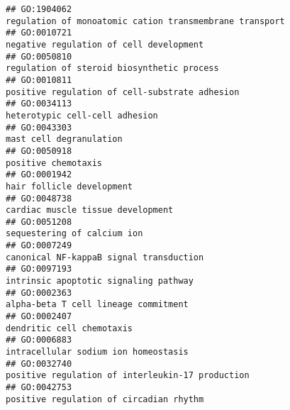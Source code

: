 \documentclass[
]{article}
\begin{document}
\begin{verbatim}
## GO:1904062                                                                                          regulation of monoatomic cation transmembrane transport
## GO:0010721                                                                                                          negative regulation of cell development
## GO:0050810                                                                                                       regulation of steroid biosynthetic process
## GO:0010811                                                                                                   positive regulation of cell-substrate adhesion
## GO:0034113                                                                                                                   heterotypic cell-cell adhesion
## GO:0043303                                                                                                                          mast cell degranulation
## GO:0050918                                                                                                                              positive chemotaxis
## GO:0001942                                                                                                                        hair follicle development
## GO:0048738                                                                                                                cardiac muscle tissue development
## GO:0051208                                                                                                                      sequestering of calcium ion
## GO:0007249                                                                                                          canonical NF-kappaB signal transduction
## GO:0097193                                                                                                            intrinsic apoptotic signaling pathway
## GO:0002363                                                                                                             alpha-beta T cell lineage commitment
## GO:0002407                                                                                                                        dendritic cell chemotaxis
## GO:0006883                                                                                                             intracellular sodium ion homeostasis
## GO:0032740                                                                                                 positive regulation of interleukin-17 production
## GO:0042753                                                                                                          positive regulation of circadian rhythm

\end{verbatim}
\end{document}
